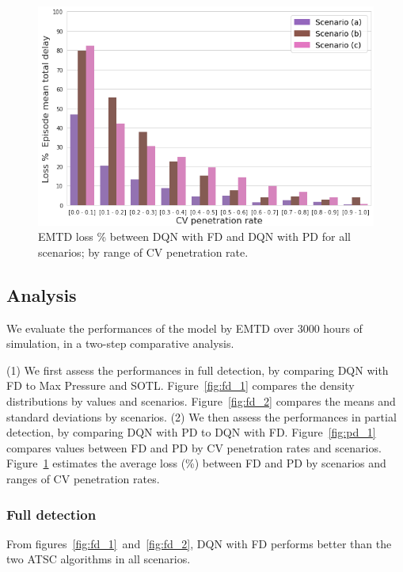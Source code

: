 \documentclass[journal]{IEEEtran}
\begin{document}
\begin{figure}[htbp]
  \begin{center}
    \includegraphics[width=1\linewidth,keepaspectratio]{img/results/pd_2.png}  
    \caption{EMTD loss \% between DQN with FD and DQN with PD for all scenarios; by range of CV penetration rate.}
    \label{fig:pd_2}
  \end{center}
\end{figure}

\subsection{Analysis}

We evaluate the performances of the model by EMTD over $3000$ hours of simulation, in a two-step comparative analysis.

(1) We first assess the performances in full detection, by comparing DQN with FD to Max Pressure and SOTL. Figure~\ref{fig:fd_1} compares the density distributions by values and scenarios. Figure~\ref{fig:fd_2} compares the means and standard deviations by scenarios. (2) We then assess the performances in partial detection, by comparing DQN with PD to DQN with FD. 
Figure~\ref{fig:pd_1} compares values between FD and PD by CV penetration rates and scenarios. Figure~\ref{fig:pd_2} estimates the average loss (\%) between FD and PD by scenarios and ranges of CV penetration rates.

\subsubsection{Full detection}
From figures~\ref{fig:fd_1}~and~\ref{fig:fd_2}, DQN with FD performs better than the two ATSC algorithms in all scenarios. 
\end{document}
